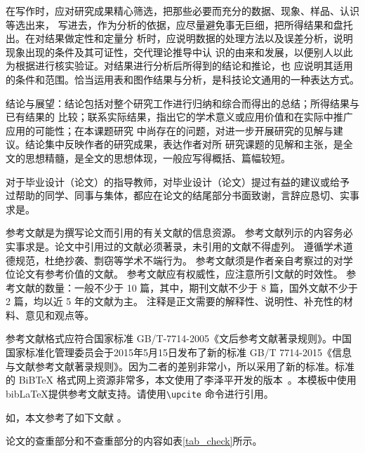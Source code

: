 在写作时，应对研究成果精心筛选，把那些必要而充分的数据、现象、样品、认识等选出来，
写进去，作为分析的依据，应尽量避免事无巨细，把所得结果和盘托出。在对结果做定性和定量分 析时，应说明数据的处理方法以及误差分析，说明现象出现的条件及其可证性，交代理论推导中认 识的由来和发展，以便别人以此为根据进行核实验证。对结果进行分析后所得到的结论和推论，也 应说明其适用的条件和范围。恰当运用表和图作结果与分析，是科技论文通用的一种表达方式。

结论与展望：结论包括对整个研究工作进行归纳和综合而得出的总结；所得结果与已有结果的
比较；联系实际结果，指出它的学术意义或应用价值和在实际中推广应用的可能性；在本课题研究 中尚存在的问题，对进一步开展研究的见解与建议。结论集中反映作者的研究成果，表达作者对所 研究课题的见解和主张，是全文的思想精髓，是全文的思想体现，一般应写得概括、篇幅较短。


对于毕业设计（论文）的指导教师，对毕业设计（论文）提过有益的建议或给予 过帮助的同学、同事与集体，都应在论文的结尾部分书面致谢，言辞应恳切、实事求是。



参考文献是为撰写论文而引用的有关文献的信息资源。
参考文献列示的内容务必实事求是。论文中引用过的文献必须著录，未引用的文献不得虚列。
遵循学术道德规范，杜绝抄袭、剽窃等学术不端行为。
参考文献须是作者亲自考察过的对学位论文有参考价值的文献。
参考文献应有权威性，应注意所引文献的时效性。 参考文献的数量：一般不少于 10 篇，其中，期刊文献不少于 8 篇，国外文献不少于 2 篇，均以近 5 年的文献为主。 注释是正文需要的解释性、说明性、补充性的材料、意见和观点等。


参考文献格式应符合国家标准 GB/T-7714-2005《文后参考文献著录规则》。中国国家标准化管理委员会于2015年5月15日发布了新的标准 GB/T 7714-2015《信息与文献参考文献著录规则》。因为二者的差别非常小，所以采用了新的标准。标准的 BiBTeX 格式网上资源非常多，本文使用了李泽平开发的版本~。本模板中使用 bib\LaTeX  提供参考文献支持。请使用\texttt{\textbackslash upcite} 命令进行引用。

如，本文参考了如下文献 。




论文的查重部分和不查重部分的内容如表\ref{tab_check}所示。

